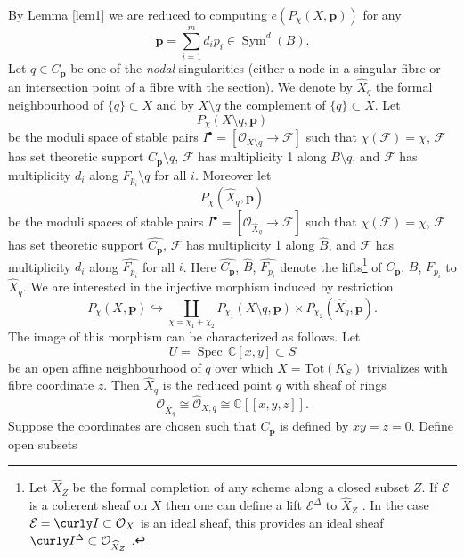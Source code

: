 \documentclass[12pt]{amsart}
\theoremstyle{definition}
\theoremstyle{property}
\newcommand\I{\curly I}
\renewcommand\O{\mathcal O}
\newcommand\mdot{{\scriptscriptstyle\bullet}}
\newcommand\cE{\mathcal E}
\newcommand\F{\mathcal F}
\newcommand\p{\mathbf{p}}
\newcommand\C{\mathbb C}
\renewcommand\_{^{}_}
\newcommand\Spec{\operatorname{Spec}\,}
\newcommand\Sym{\operatorname{Sym}}
\begin{document}
By Lemma \ref{lem1} we are reduced to computing $e(P_\chi(X,\p))$ for any 
$$
\p = \sum_{i=1}^m d_i p_i \in \Sym^d(B).
$$ 
Let $q \in C_{\p}$ be one of the \emph{nodal} singularities (either a node in a singular fibre or an intersection point of a fibre with the section). We denote by $\widehat{X}_q$ the formal neighbourhood of $\{q\} \subset X$ and by $X \setminus q$ the complement of $\{q\} \subset X$. Let
$$
P_{\chi}(X \setminus q, \p)
$$
be the moduli space of stable pairs $I^\mdot = [\O_{X \setminus q} \rightarrow \F]$ such that $\chi(\F) = \chi$, $\F$ has set theoretic support $C_{\p} \setminus q$, $\F$ has multiplicity 1 along $B \setminus q$, and $\F$ has multiplicity $d_i$ along $F_{p_i} \setminus q$ for all $i$. Moreover let  
$$
P_{\chi}(\widehat{X}_q,\p)
$$
be the moduli spaces of stable pairs $I^\mdot = [\O_{\widehat{X}_q} \rightarrow \F]$ such that $\chi(\F) = \chi$, $\F$ has set theoretic support $\widehat{C_{\p}}$, $\F$ has multiplicity 1 along $\widehat{B}$, and $\F$ has multiplicity $d_i$ along $\widehat{F_{p_i}}$ for all $i$. Here $\widehat{C_{\p}}$, $\widehat{B}$, $\widehat{F_{p_i}}$ denote the lifts\footnote{Let $\widehat{X}_{Z}$ be the formal completion of any scheme along a closed subset $Z$. If $\cE$ is a coherent sheaf on $X$ then one can define a lift $\cE^{\Delta}$ to $\widehat{X}_{Z}$ \cite{Har}. In the case $\cE = \I \subset \O_X$ is an ideal sheaf, this provides an ideal sheaf $\I^{\Delta} \subset \O_{\widehat{X}_Z}$ \cite{Har}.} of $C_{\p}$, $B$, $F_{p_i}$ to $\widehat{X}_q$. We are interested in the injective morphism induced by restriction
\begin{equation} \label{embd1}
P_\chi(X,\p) \hookrightarrow \coprod_{\chi = \chi_1 + \chi_2} P_{\chi_1}(X \setminus q,\p) \times P_{\chi_2}(\widehat{X}_q,\p).
\end{equation}
The image of this morphism can be characterized as follows. Let 
$$
U = \Spec \C[x,y] \subset S
$$
be an open affine neighbourhood of $q$ over which $X = \mathrm{Tot}(K_S)$ trivializes with fibre coordinate $z$. Then $\widehat{X}_q$ is the reduced point $q$ with sheaf of rings
$$
\O_{\widehat{X}_q} \cong \widehat{\O}_{X,q} \cong \C[\![x,y,z]\!].
$$
Suppose the coordinates are chosen such that $C_{\p}$ is defined by $xy = z = 0$. Define open subsets
\end{document}
